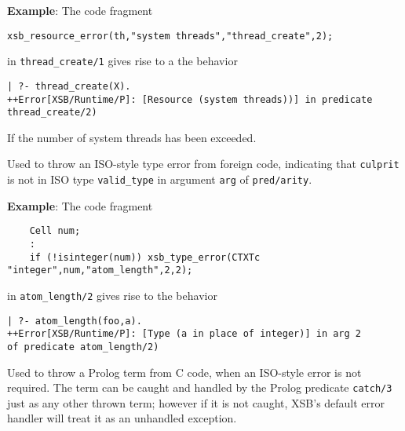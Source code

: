 \begin{description}
{\bf Example}: The code fragment
%
\begin{verbatim}
xsb_resource_error(th,"system threads","thread_create",2);
\end{verbatim}
in {\tt thread\_create/1} gives rise to a the behavior
\begin{verbatim}
| ?- thread_create(X).
++Error[XSB/Runtime/P]: [Resource (system threads))] in predicate thread_create/2)
\end{verbatim}
If the number of system threads has been exceeded.

%
Used to throw an ISO-style type error from foreign code, indicating
that {\tt culprit} is not in ISO type {\tt valid\_type} in argument
{\tt arg} of {\tt pred/arity}.

{\bf Example}: The code fragment
%
\begin{verbatim}
    Cell num;
    : 
    if (!isinteger(num)) xsb_type_error(CTXTc "integer",num,"atom_length",2,2);
\end{verbatim}
in {\tt atom\_length/2} gives rise to the behavior
%
\begin{verbatim}
| ?- atom_length(foo,a).
++Error[XSB/Runtime/P]: [Type (a in place of integer)] in arg 2 
of predicate atom_length/2)
\end{verbatim}


%
Used to throw a Prolog term from C code, when an ISO-style error is
not required.  The term can be caught and handled by the Prolog
predicate {\tt catch/3} just as any other thrown term; however if it
is not caught, XSB's default error handler will treat it as an
unhandled exception.

\end{description}

